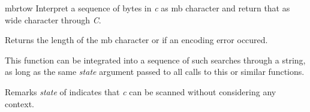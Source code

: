 \begin{DoxyDocu}{mbrtow}
\label{mbstrings_8h_ac5ce530f38843611b5ef023306d6f686_ac5ce530f38843611b5ef023306d6f686}
Interpret a sequence of bytes in {\itshape c} as mb character and return that as wide character through {\itshape C}.

\begin{DoxyReturn}{Returns}
the length of the mb character or  if an encoding error occured.
\end{DoxyReturn}
This function can be integrated into a sequence of such searches through a string, as long as the same {\itshape state} argument passed to all calls to this or similar functions.

\begin{DoxyRemark}{Remarks}
{\itshape state} of  indicates that {\itshape c} can be scanned without considering any context.
\end{DoxyRemark}


\end{DoxyDocu}
